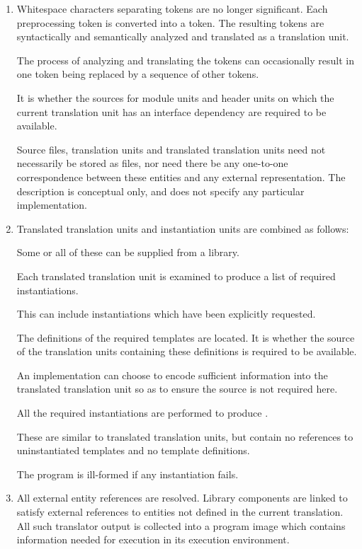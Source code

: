 \begin{enumerate}
\item Whitespace characters separating tokens are no longer
significant. Each preprocessing token is converted into a
token. The resulting tokens are syntactically and
semantically analyzed and translated as a translation unit.
\begin{note}
The process of analyzing and translating the tokens can occasionally
result in one token being replaced by a sequence of other
tokens.
\end{note}
It is
whether the sources for
module units and header units
on which the current translation unit has an interface
dependency
are required to be available.
\begin{note}
Source files, translation
units and translated translation units need not necessarily be stored as
files, nor need there be any one-to-one correspondence between these
entities and any external representation. The description is conceptual
only, and does not specify any particular implementation.
\end{note}

\item Translated translation units and instantiation units are combined
as follows:
\begin{note}
Some or all of these can be supplied from a
library.
\end{note}
Each translated translation unit is examined to
produce a list of required instantiations.
\begin{note}
This can include
instantiations which have been explicitly
requested.
\end{note}
The definitions of the
required templates are located. It is  whether the
source of the translation units containing these definitions is required
to be available.
\begin{note}
An implementation can choose to encode sufficient
information into the translated translation unit so as to ensure the
source is not required here.
\end{note}
All the required instantiations
are performed to produce
.
\begin{note}
These are similar
to translated translation units, but contain no references to
uninstantiated templates and no template definitions.
\end{note}
The
program is ill-formed if any instantiation fails.

\item All external entity references are resolved. Library
components are linked to satisfy external references to
entities not defined in the current translation. All such translator
output is collected into a program image which contains information
needed for execution in its execution environment.%
\end{enumerate}

